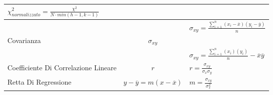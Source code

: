 \begin{adjustwidth}{-10mm}{-10mm}
\begin{center}
\begin{tabular}{|p{5cm}|c|p{6cm}|}
\(\chi^2_{normalizzato}=\frac{\chi^2}{N\cdot min(h-1,k-1)}\)\\
\hline
&&\(\sigma_{xy}=\frac{\sum_{i=1}^{n}(x_i-\overline{x})(y_i-\overline{y})}{n}\)\\
Covarianza &\(\sigma_{xy}\)&\\
&&\(\sigma_{xy}=\frac{\sum_{i=1}^{n}(x_i)(y_i)}{n}-\overline{x}\overline{y}\)\\
\hline
Coefficiente Di Correlazione Lineare &   \(r\)& 
\(r=\frac{\sigma_{xy}}{\sigma_x\sigma_y}\)\\
\hline 
Retta Di Regressione & \(y-\overline{y}=m(x-\overline{x})\)&
\(m=\frac{\sigma_{xy}}{\sigma^{2}_{x}}\)\\
\hline
\end{tabular}
\end{center}
    \end{adjustwidth}






